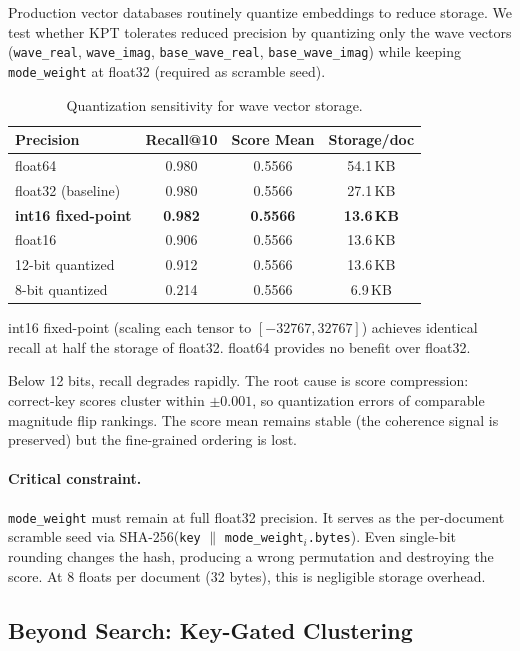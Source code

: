 \documentclass{article}
\begin{document}
Production vector databases routinely quantize embeddings to reduce storage.
We test whether KPT tolerates reduced precision by quantizing only the wave vectors (\texttt{wave\_real}, \texttt{wave\_imag}, \texttt{base\_wave\_real}, \texttt{base\_wave\_imag}) while keeping \texttt{mode\_weight} at float32 (required as scramble seed).

\begin{table}[htbp]
\centering
\caption{Quantization sensitivity for wave vector storage.}
\label{tab:quantization}
\begin{tabular}{@{}lccc@{}}
\toprule
\textbf{Precision} & \textbf{Recall@10} & \textbf{Score Mean} & \textbf{Storage/doc} \\
\midrule
float64 & 0.980 & 0.5566 & 54.1\,KB \\
float32 (baseline) & 0.980 & 0.5566 & 27.1\,KB \\
\textbf{int16 fixed-point} & \textbf{0.982} & \textbf{0.5566} & \textbf{13.6\,KB} \\
float16 & 0.906 & 0.5566 & 13.6\,KB \\
12-bit quantized & 0.912 & 0.5566 & 13.6\,KB \\
8-bit quantized & 0.214 & 0.5566 & 6.9\,KB \\
\bottomrule
\end{tabular}
\end{table}

int16 fixed-point (scaling each tensor to $[-32767, 32767]$) achieves identical recall at half the storage of float32.
float64 provides no benefit over float32.

Below 12 bits, recall degrades rapidly.
The root cause is score compression: correct-key scores cluster within $\pm 0.001$, so quantization errors of comparable magnitude flip rankings.
The score mean remains stable (the coherence signal is preserved) but the fine-grained ordering is lost.

\paragraph{Critical constraint.}
\texttt{mode\_weight} must remain at full float32 precision.
It serves as the per-document scramble seed via SHA-256(\texttt{key} $\|$ \texttt{mode\_weight}$_i$\texttt{.bytes}).
Even single-bit rounding changes the hash, producing a wrong permutation and destroying the score.
At 8 floats per document (32 bytes), this is negligible storage overhead.

\subsection{Beyond Search: Key-Gated Clustering}
\end{document}

